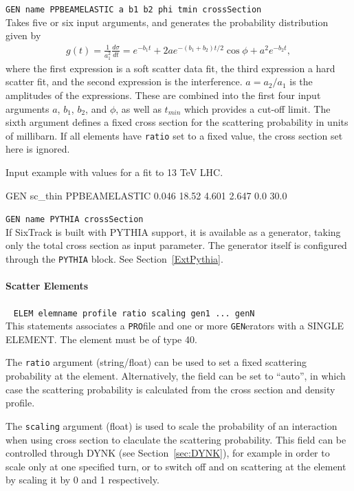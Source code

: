 \bigskip
\noindent\texttt{GEN name PPBEAMELASTIC a b1 b2 phi tmin crossSection} \\

Takes five or six input arguments, and generates the probability distribution given by
\begin{align}
    g(t) = \frac{1}{a_1^2}\frac{d\sigma}{dt} = e^{-b_1 t}+ 2ae^{-(b_1+b_2)t/2}\cos{\phi} + a^2e^{-b_2 t},
\end{align}
where the first expression is a soft scatter data fit, the third expression a hard scatter fit, and the second expression is the interference. $a = a_2/a_1$ is the amplitudes of the expressions.
These are combined into the first four input arguments $a$, $b_1$, $b_2$, and $\phi$, as well as $t_{min}$ which provides a cut-off limit.
The sixth argument defines a fixed cross section for the scattering probability in units of millibarn.
If all elements have \texttt{ratio} set to a fixed value, the cross section set here is ignored.

Input example with values for a fit to 13 TeV LHC.
\begin{cverbatim}
GEN  sc_thin     PPBEAMELASTIC 0.046 18.52 4.601 2.647 0.0 30.0
\end{cverbatim}

\bigskip
\noindent\texttt{GEN name PYTHIA crossSection} \\

If SixTrack is built with PYTHIA support, it is available as a generator, taking only the total cross section as input parameter.
The generator itself is configured through the \texttt{PYTHIA} block.
See Section~\ref{ExtPythia}.

\paragraph{Scatter Elements}~ \texttt{ELEM elemname profile ratio scaling gen1 ... genN}\\

This statements associates a \texttt{PRO}file and one or more \texttt{GEN}erators with a SINGLE ELEMENT.
The element must be of type 40.

The \texttt{ratio} argument (string/float) can be used to set a fixed scattering probability at the element.
Alternatively, the field can be set to ``auto'', in which case the scattering probability is calculated from the cross section and density profile.

The \texttt{scaling} argument (float) is used to scale the probability of an interaction when using cross section to claculate the scattering probability.
This field can be controlled through DYNK (see Section~\ref{sec:DYNK}), for example in order to scale only at one specified turn, or to switch off and on scattering at the element by scaling it by 0 and 1 respectively.

